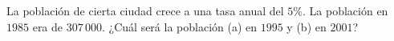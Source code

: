 \item La población de cierta ciudad crece a una tasa anual del $5\%$. La población en $1985$ era de $307\,000$. ¿Cuál será la población (a) en $1995$ y (b) en $2001$?
